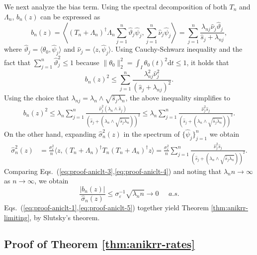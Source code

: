 \documentclass[11pt,a4paper]{article}
\renewcommand{\hat}{\widehat}
\theoremstyle{definition}
\theoremstyle{plain}
\theoremstyle{remark}
\newcommand{\ud}{\mathrm d}
\begin{document}
We next analyze the bias term. Using the spectral decomposition of both $T_n$ and $\Lambda_n$, $b_n(z)$ can be expressed as
$$
b_n(z) = \left\langle(T_n+\Lambda_n)^{\dagger}\Lambda_n\sum_{j=1}^n\hat\vartheta_j\hat\psi_j, \sum_{j=1}^n\hat\nu_j\hat\psi_j\right\rangle = \sum_{j=1}^n\frac{\lambda_{nj}\hat\nu_j\hat\vartheta_j}{\hat s_j+\lambda_{nj}},
$$
where $\hat\vartheta_j=\langle\theta_0,\hat\psi_j\rangle$ and $\hat\nu_j = \langle z,\hat\psi_j\rangle$.
Using Cauchy-Schwarz inequality and the fact that $\sum_{j=1}^n\hat\vartheta_j^2\leq 1$ because $\|\theta_0\|_2^2 = \int_I\theta_0(t)^2\ud t\leq 1$, it holds that
$$
b_n(z)^2 \leq \sum_{j=1}^n\frac{\lambda_{nj}^2\hat\nu_j^2}{(\hat s_j+\lambda_{nj})^2}.
$$
Using the choice that $\lambda_{nj}=\lambda_n\wedge \sqrt{\hat s_j\lambda_n}$, the above inequality simplifies to
\begin{align}
b_n(z)^2 \leq \lambda_n\sum_{j=1}^n\frac{\hat\nu_j^2(\lambda_n\wedge\hat s_j)}{(\hat s_j+(\lambda_n\wedge\sqrt{\hat s_j\lambda_n}))^2}\leq \lambda_n\sum_{j=1}^n\frac{\hat\nu_j^2\hat s_j}{(\hat s_j+(\lambda_n\wedge\sqrt{\hat s_j\lambda_n}))^2}.
\label{eq:proof-aniclt-3}
\end{align}
On the other hand, expanding $\hat\sigma_n^2(z)$ in the spectrum of $\{\hat\psi_j\}_{j=1}^n$ we obtain
\begin{align}
\hat\sigma_n^2(z) &= \frac{\sigma_\varepsilon^2}{n}\langle z, (T_n+\Lambda_n)^{\dagger}T_n(T_n+\Lambda_n)^{\dagger}z\rangle = \frac{\sigma_\varepsilon^2}{n}\sum_{j=1}^n\frac{\hat\nu_j^2\hat s_j}{(\hat s_j+(\lambda_n\wedge\sqrt{\hat s_j\lambda_n}))^2}.
\label{eq:proof-aniclt-4}
\end{align}
Comparing Eqs.~(\ref{eq:proof-aniclt-3},\ref{eq:proof-aniclt-4}) and noting that $\lambda_n n\to\infty$ as $n\to\infty$, we obtain
\begin{equation}
\frac{|b_n(z)|}{\hat\sigma_n(z)} \leq \sigma_\varepsilon^{-1}\sqrt{\lambda_n n} \to 0\;\;\;\;\;a.s.
\label{eq:proof-aniclt-5}
\end{equation}
Eqs.~(\ref{eq:proof-aniclt-1},\ref{eq:proof-aniclt-5}) together yield Theorem \ref{thm:anikrr-limiting}, by Slutsky's theorem.

\subsection{Proof of Theorem \ref{thm:anikrr-rates}}
\end{document}
